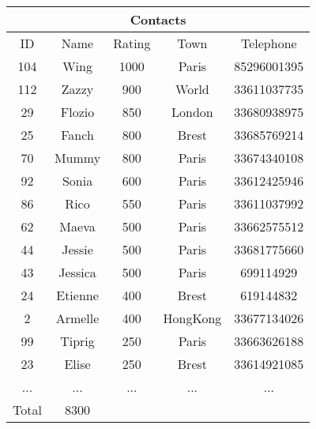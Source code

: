 \begin{longtable}{|c|c|c|c|c|}
\hline
\multicolumn{5}{|c|}{Contacts} \\
\hline
ID & Name & Rating & Town & Telephone\\
\hline
104 & Wing & 1000 & Paris & 85296001395\\
\hline
112 & Zazzy & 900 & World & 33611037735\\
\hline
29 & Flozio & 850 & London & 33680938975\\
\hline
25 & Fanch & 800 & Brest & 33685769214\\
\hline
70 & Mummy & 800 & Paris & 33674340108\\
\hline
92 & Sonia & 600 & Paris & 33612425946\\
\hline
86 & Rico & 550 & Paris & 33611037992\\
\hline
62 & Maeva & 500 & Paris & 33662575512\\
\hline
44 & Jessie & 500 & Paris & 33681775660\\
\hline
43 & Jessica & 500 & Paris & 699114929\\
\hline
24 & Etienne & 400 & Brest & 619144832\\
\hline
2 & Armelle & 400 & HongKong & 33677134026\\
\hline
99 & Tiprig & 250 & Paris & 33663626188\\
\hline
23 & Elise & 250 & Brest & 33614921085\\
\hline
 ... & ... & ... & ... & ... \\
\hline
Total & 8300 &  & & \\
\hline
\end{longtable}
